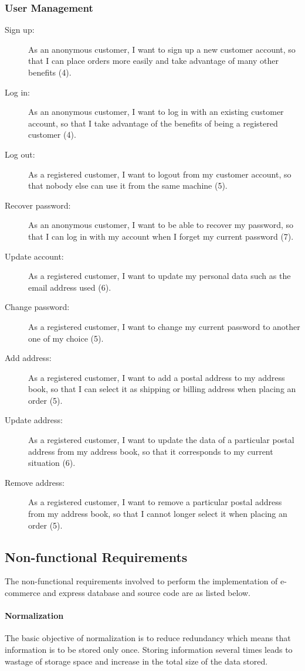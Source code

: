 \subsubsection{User Management}
\begin{description}
	\item[Sign up:] As an anonymous customer, I want to sign up a new customer account, so that I can place orders more easily and take advantage of many other benefits (4).
	\item[Log in:] As an anonymous customer, I want to log in with an existing customer account, so that I take advantage of the benefits of being a registered customer (4).
	\item[Log out:] As a registered customer, I want to logout from my customer account, so that nobody else can use it from the same machine (5).
	\item[Recover password:] As an anonymous customer, I want to be able to recover my password, so that I can log in with my account when I forget my current password (7).
	\item[Update account:] As a registered customer, I want to update my personal data such as the email address used (6).
	\item[Change password:] As a registered customer, I want to change my current password to another one of my choice (5).
	\item[Add address:] As a registered customer, I want to add a postal address to my address book, so that I can select it as shipping or billing address when placing an order (5).
	\item[Update address:] As a registered customer, I want to update the data of a particular postal address from my address book, so that it corresponds to my current situation (6).
	\item[Remove address:] As a registered customer, I want to remove a particular postal address from my address book, so that I cannot longer select it when placing an order (5).
\end{description}

\subsection{Non-functional Requirements} 
The non-functional requirements involved to perform the implementation of e-commerce and express database and source code are as listed below.

\paragraph{Normalization}
The basic objective of normalization is to reduce redundancy which means that information is to be stored only once. Storing information several times leads to wastage of storage space and increase in the total size of the data stored.


